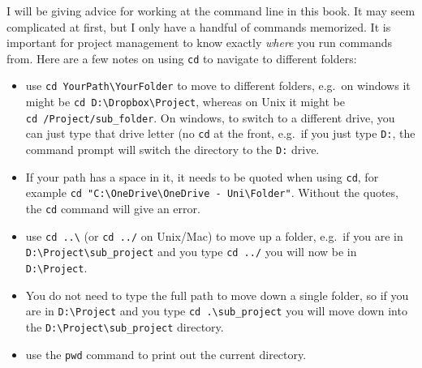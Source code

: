 \documentclass[
  letterpaper,
]{scrbook}
\providecommand{\tightlist}{%
  \setlength{\itemsep}{0pt}\setlength{\parskip}{0pt}}\usepackage{longtable,booktabs,array}
\begin{document}
\begin{tcolorbox}[enhanced jigsaw, toprule=.15mm, rightrule=.15mm, arc=.35mm, opacityback=0, coltitle=black, bottomrule=.15mm, left=2mm, opacitybacktitle=0.6, bottomtitle=1mm, colback=white, colframe=quarto-callout-note-color-frame, colbacktitle=quarto-callout-note-color!10!white, titlerule=0mm, breakable, title={Note}, toptitle=1mm, leftrule=.75mm]

I will be giving advice for working at the command line in this book. It
may seem complicated at first, but I only have a handful of commands
memorized. It is important for project management to know exactly
\emph{where} you run commands from. Here are a few notes on using
\texttt{cd} to navigate to different folders:

\begin{itemize}
\tightlist
\item
  use \texttt{cd\ YourPath\textbackslash{}YourFolder} to move to
  different folders, e.g.~on windows it might be
  \texttt{cd\ D:\textbackslash{}Dropbox\textbackslash{}Project}, whereas
  on Unix it might be \texttt{cd\ /Project/sub\_folder}. On windows, to
  switch to a different drive, you can just type that drive letter (no
  \texttt{cd} at the front, e.g.~if you just type \texttt{D:}, the
  command prompt will switch the directory to the \texttt{D:} drive.
\item
  If your path has a space in it, it needs to be quoted when using
  \texttt{cd}, for example
  \texttt{cd\ "C:\textbackslash{}OneDrive\textbackslash{}OneDrive\ -\ Uni\textbackslash{}Folder"}.
  Without the quotes, the \texttt{cd} command will give an error.
\item
  use \texttt{cd\ ..\textbackslash{}} (or \texttt{cd\ ../} on Unix/Mac)
  to move up a folder, e.g.~if you are in
  \texttt{D:\textbackslash{}Project\textbackslash{}sub\_project} and you
  type \texttt{cd\ ../} you will now be in
  \texttt{D:\textbackslash{}Project}.
\item
  You do not need to type the full path to move down a single folder, so
  if you are in \texttt{D:\textbackslash{}Project} and you type
  \texttt{cd\ .\textbackslash{}sub\_project} you will move down into the
  \texttt{D:\textbackslash{}Project\textbackslash{}sub\_project}
  directory.
\item
  use the \texttt{pwd} command to print out the current directory.
\end{itemize}

\end{tcolorbox}
\end{document}
